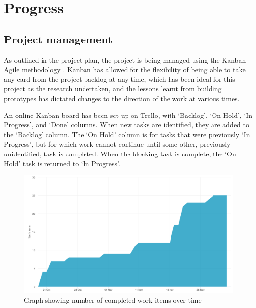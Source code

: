 \chapter{Progress}




\section{Project management}

As outlined in the project plan, the project is being managed using the Kanban Agile methodology \cite{stellman2014learning}. Kanban has allowed for the flexibility of being able to take any card from the project backlog at any time, which has been ideal for this project as the research undertaken, and the lessons learnt from building prototypes has dictated changes to the direction of the work at various times. 

An online Kanban board has been set up on Trello, with `Backlog', `On Hold', `In Progress', and `Done' columns. When new tasks are identified, they are added to the `Backlog' column. The `On Hold' column is for tasks that were previously `In Progress', but for which work cannot continue until some other, previously unidentified, task is completed. When the blocking task is complete, the `On Hold' task is returned to `In Progress'.

\begin{figure}[h!]
  \centering
  \includegraphics[width=\textwidth]{images/burnup.png}
  \caption{Graph showing number of completed work items over time}
  \label{fig:burnup}
\end{figure}

